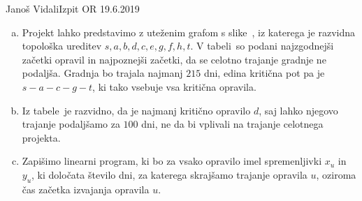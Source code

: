\begin{naloga}{Janoš Vidali}{Izpit OR 19.6.2019}
\begin{odgovor}
\begin{enumerate}[(a)]
\item Projekt lahko predstavimo z uteženim grafom s slike~\fig,
iz katerega je raz\-vid\-na topološka ureditev $s, a, b, d, c, e, g, f, h, t$.
V tabeli~
so podani naj\-zgod\-nej\-ši začetki opravil in najpoznejši začetki,
da se celotno trajanje gradnje ne podaljša.
Gradnja bo trajala najmanj $215$ dni,
edina kritična pot pa je $s - a - c - g - t$,
ki tako vsebuje vsa kritična opravila.

\item Iz tabele~ je razvidno,
da je najmanj kritično opravilo $d$,
saj lahko njegovo trajanje podaljšamo za $100$ dni,
ne da bi vplivali na trajanje celotnega projekta.

\item Zapišimo linearni program,
ki bo za vsako opravilo imel spremenljivki $x_u$ in $y_u$,
ki določata število dni, za katerega skrajšamo trajanje opravila $u$,
oziroma čas začetka izvajanja opravila $u$.


\end{enumerate}
\end{odgovor}
\end{naloga}
